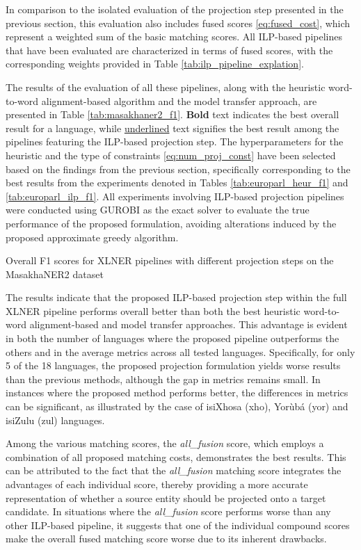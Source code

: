 In comparison to the isolated evaluation of the projection step presented in the
previous section, this evaluation also includes fused scores \eqref{eq:fused_cost},
which represent a weighted sum of the basic matching scores. All ILP-based pipelines
that have been evaluated are characterized in terms of fused scores, with the
corresponding weights provided in Table \ref{tab:ilp_pipeline_explation}.

The results of the evaluation of all these pipelines, along with the heuristic
word-to-word alignment-based algorithm and the model transfer approach, are presented
in Table \ref{tab:masakhaner2_f1}. \textbf{Bold} text indicates the best overall result for a
language, while \underline{underlined} text signifies the best result among the pipelines featuring
the ILP-based projection step. The hyperparameters for the heuristic and the type of
constraints \eqref{eq:num_proj_const} have been selected based on the findings from the
previous section, specifically corresponding to the best results from the experiments
denoted in Tables \ref{tab:europarl_heur_f1} and \ref{tab:europarl_ilp_f1}.
All experiments involving ILP-based projection pipelines were conducted using GUROBI as
the exact solver to evaluate the true performance of the proposed formulation, avoiding
alterations induced by the proposed approximate greedy algorithm.

\begin{table}[ht]
  
  \caption{Overall F1 scores for XLNER pipelines with different projection steps on the
  MasakhaNER2 dataset}
  \label{tab:masakhaner2_f1}
\end{table}

The results indicate that the proposed ILP-based projection step within the full
XLNER pipeline performs overall better than both the best heuristic word-to-word
alignment-based and model transfer approaches. This advantage is evident in both
the number of languages where the proposed pipeline outperforms the others and in
the average metrics across all tested languages. Specifically, for only 5 of the 18
languages, the proposed projection formulation yields worse results than the previous
methods, although the gap in metrics remains small. In instances where the proposed
method performs better, the differences in metrics can be significant, as illustrated
by the case of isiXhosa (xho), Yorùbá (yor) and isiZulu (zul) languages.

Among the various matching scores, the \textit{all\_fusion} score, which employs a
combination of all proposed matching costs, demonstrates the best results. This can
be attributed to the fact that the \textit{all\_fusion} matching score integrates the advantages
of each individual score, thereby providing a more accurate representation of whether
a source entity should be projected onto a target candidate. In situations where the
\textit{all\_fusion} score performs worse than any other ILP-based pipeline, it
suggests that one of the individual compound scores make the overall
fused matching score worse due to its inherent drawbacks.

